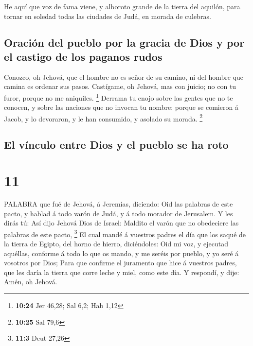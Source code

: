  He aquí que voz de fama viene, y alboroto grande de la
tierra del aquilón, para tornar en soledad todas las ciudades de Judá,
en morada de culebras.

\hypertarget{oraciuxf3n-del-pueblo-por-la-gracia-de-dios-y-por-el-castigo-de-los-paganos-rudos}{%
\subsection{Oración del pueblo por la gracia de Dios y por el castigo de
los paganos
rudos}\label{oraciuxf3n-del-pueblo-por-la-gracia-de-dios-y-por-el-castigo-de-los-paganos-rudos}}

 Conozco, oh Jehová, que el hombre no es señor de su
camino, ni del hombre que camina es ordenar sus pasos. 
Castígame, oh Jehová, mas con juicio; no con tu furor, porque no me
aniquiles. \footnote{\textbf{10:24} Jer 46,28; Sal 6,2; Hab 1,12}
 Derrama tu enojo sobre las gentes que no te conocen, y
sobre las naciones que no invocan tu nombre: porque se comieron á Jacob,
y lo devoraron, y le han consumido, y asolado su morada. \footnote{\textbf{10:25}
  Sal 79,6}

\hypertarget{el-vuxednculo-entre-dios-y-el-pueblo-se-ha-roto}{%
\subsection{El vínculo entre Dios y el pueblo se ha
roto}\label{el-vuxednculo-entre-dios-y-el-pueblo-se-ha-roto}}

\hypertarget{section-10}{%
\section{11}\label{section-10}}

 PALABRA que fué de Jehová, á Jeremías, diciendo:
 Oid las palabras de este pacto, y hablad á todo varón de
Judá, y á todo morador de Jerusalem.  Y les dirás tú: Así
dijo Jehová Dios de Israel: Maldito el varón que no obedeciere las
palabras de este pacto, \footnote{\textbf{11:3} Deut 27,26} 
El cual mandé á vuestros padres el día que los saqué de la tierra de
Egipto, del horno de hierro, diciéndoles: Oid mi voz, y ejecutad
aquéllas, conforme á todo lo que os mando, y me seréis por pueblo, y yo
seré á vosotros por Dios;  Para que confirme el juramento
que hice á vuestros padres, que les daría la tierra que corre leche y
miel, como este día. Y respondí, y dije: Amén, oh Jehová.

